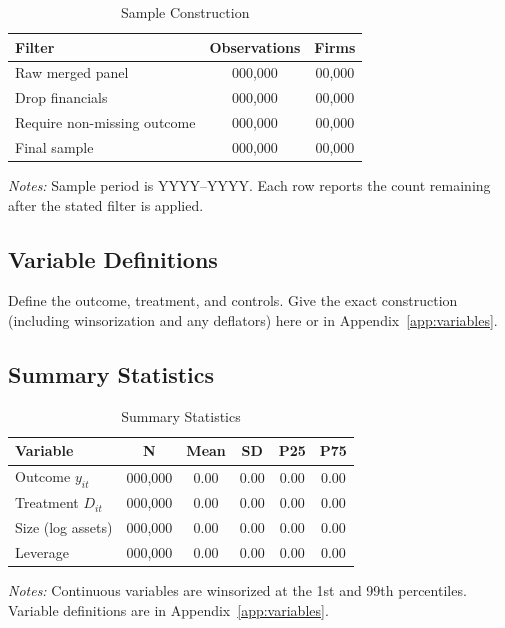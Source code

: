 \documentclass[letterpaper,11pt]{article}
\begin{document}
\begin{table}[htbp]
  \centering
  \caption{Sample Construction}
  \label{tab:sample}
  \begin{tabular}{lcc}
    \toprule
    Filter & Observations & Firms \\
    \midrule
    Raw merged panel      & 000{,}000 & 00{,}000 \\
    Drop financials       & 000{,}000 & 00{,}000 \\
    Require non-missing outcome & 000{,}000 & 00{,}000 \\
    \midrule
    Final sample          & 000{,}000 & 00{,}000 \\
    \bottomrule
  \end{tabular}

  \vspace{0.5em}
  {\footnotesize \textit{Notes:} Sample period is YYYY--YYYY. Each row reports
  the count remaining after the stated filter is applied.}
\end{table}

\subsection{Variable Definitions}

Define the outcome, treatment, and controls. Give the exact construction
(including winsorization and any deflators) here or in
Appendix~\ref{app:variables}.

\subsection{Summary Statistics}

\begin{table}[htbp]
  \centering
  \caption{Summary Statistics}
  \label{tab:sumstats}
  \begin{tabular}{lccccc}
    \toprule
    Variable & N & Mean & SD & P25 & P75 \\
    \midrule
    Outcome $y_{it}$    & 000{,}000 & 0.00 & 0.00 & 0.00 & 0.00 \\
    Treatment $D_{it}$  & 000{,}000 & 0.00 & 0.00 & 0.00 & 0.00 \\
    Size (log assets)   & 000{,}000 & 0.00 & 0.00 & 0.00 & 0.00 \\
    Leverage            & 000{,}000 & 0.00 & 0.00 & 0.00 & 0.00 \\
    \bottomrule
  \end{tabular}

  \vspace{0.5em}
  {\footnotesize \textit{Notes:} Continuous variables are winsorized at the 1st
  and 99th percentiles. Variable definitions are in
  Appendix~\ref{app:variables}.}
\end{table}
\end{document}
